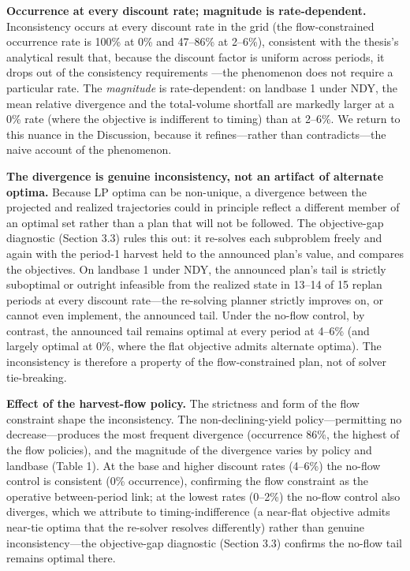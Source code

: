 \textbf{Occurrence at every discount rate; magnitude is rate-dependent.} Inconsistency occurs at every discount rate in the grid (the flow-constrained occurrence rate is 100\% at 0\% and 47--86\% at 2--6\%), consistent with the thesis's analytical result that, because the discount factor is uniform across periods, it drops out of the consistency requirements \citep[ch.~3, p.~58--59]{daugherty1991credibility}---the phenomenon does not require a particular rate. The \emph{magnitude} is rate-dependent: on landbase 1 under NDY, the mean relative divergence and the total-volume shortfall are markedly larger at a 0\% rate (where the objective is indifferent to timing) than at 2--6\%. We return to this nuance in the Discussion, because it refines---rather than contradicts---the naive account of the phenomenon.

\textbf{The divergence is genuine inconsistency, not an artifact of alternate optima.} Because LP optima can be non-unique, a divergence between the projected and realized trajectories could in principle reflect a different member of an optimal set rather than a plan that will not be followed. The objective-gap diagnostic (Section 3.3) rules this out: it re-solves each subproblem freely and again with the period-1 harvest held to the announced plan's value, and compares the objectives. On landbase 1 under NDY, the announced plan's tail is strictly suboptimal or outright infeasible from the realized state in 13--14 of 15 replan periods at every discount rate---the re-solving planner strictly improves on, or cannot even implement, the announced tail. Under the no-flow control, by contrast, the announced tail remains optimal at every period at 4--6\% (and largely optimal at 0\%, where the flat objective admits alternate optima). The inconsistency is therefore a property of the flow-constrained plan, not of solver tie-breaking.

\textbf{Effect of the harvest-flow policy.} The strictness and form of the flow constraint shape the inconsistency. The non-declining-yield policy---permitting no decrease---produces the most frequent divergence (occurrence 86\%, the highest of the flow policies), and the magnitude of the divergence varies by policy and landbase (Table 1). At the base and higher discount rates (4--6\%) the no-flow control is consistent (0\% occurrence), confirming the flow constraint as the operative between-period link; at the lowest rates (0--2\%) the no-flow control also diverges, which we attribute to timing-indifference (a near-flat objective admits near-tie optima that the re-solver resolves differently) rather than genuine inconsistency---the objective-gap diagnostic (Section 3.3) confirms the no-flow tail remains optimal there.

